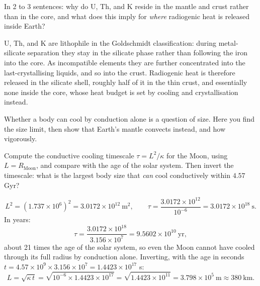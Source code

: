 \parti In 2 to 3 sentences: why do U, Th, and K reside in the mantle and crust rather than in
the core, and what does this imply for \emph{where} radiogenic heat is released inside Earth?

\begin{solution}
U, Th, and K are lithophile in the Goldschmidt classification: during metal-silicate
separation they stay in the silicate phase rather than following the iron into the core.
As incompatible elements they are further concentrated into the last-crystallising liquids,
and so into the crust. Radiogenic heat is therefore released in the silicate shell,
roughly half of it in the thin crust, and essentially none inside the core, whose heat
budget is set by cooling and crystallisation instead.
\end{solution}



Whether a body can cool by conduction alone is a question of size.
Here you find the size limit, then show that Earth's mantle convects instead, and how vigorously.

\parti Compute the conductive cooling timescale $\tau = L^2/\kappa$ for the Moon, using
$L = R_\mathrm{Moon}$, and compare with the
age of the solar system. Then invert the timescale: what is the largest body size that
\emph{can} cool conductively within $4.57$ Gyr?

\begin{solution}
\[
  L^2 = (1.737 \times 10^{6})^2 = 3.0172 \times 10^{12}\ \mathrm{m^2},
  \qquad
  \tau = \frac{3.0172 \times 10^{12}}{10^{-6}} = 3.0172 \times 10^{18}\ \mathrm{s}.
\]
In years:
\[
  \tau = \frac{3.0172 \times 10^{18}}{3.156 \times 10^{7}} = 9.5602 \times 10^{10}\ \mathrm{yr},
\]
about 21 times the age of the solar system, so even the Moon cannot
have cooled through its full radius by conduction alone. Inverting, with the age in seconds
$t = 4.57 \times 10^{9} \times 3.156 \times 10^{7} = 1.4423 \times 10^{17}$ s:
\[
  L = \sqrt{\kappa\,t} = \sqrt{10^{-6} \times 1.4423 \times 10^{17}} = \sqrt{1.4423 \times 10^{11}}
    = 3.798 \times 10^{5}\ \mathrm{m} \approx 380\ \mathrm{km}.
\]
\end{solution}

